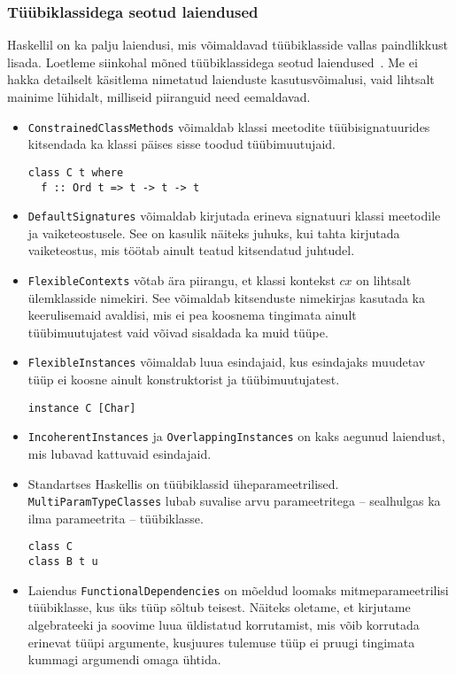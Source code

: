 \documentclass[12pt]{article}
\begin{document}
      \subsubsection{Tüübiklassidega seotud laiendused}
        Haskellil on ka palju laiendusi, mis võimaldavad tüübiklasside vallas paindlikkust lisada. Loetleme siinkohal mõned tüübiklassidega seotud laiendused~\cite{Gla}. Me ei hakka detailselt käsitlema nimetatud laienduste kasutusvõimalusi, vaid lihtsalt mainime lühidalt, milliseid piiranguid need eemaldavad.

        \begin{itemize}
          \item
            \verb!ConstrainedClassMethods! võimaldab klassi meetodite tüübisignatuurides kitsendada ka klassi päises sisse toodud tüübimuutujaid.

            \begin{verbatim}class C t where
  f :: Ord t => t -> t -> t\end{verbatim}
          \item
            \verb!DefaultSignatures! võimaldab kirjutada erineva signatuuri klassi meetodile ja vaiketeostusele. See on kasulik näiteks juhuks, kui tahta kirjutada vaiketeostus, mis töötab ainult teatud kitsendatud juhtudel.
          \item
            \verb!FlexibleContexts! võtab ära piirangu, et klassi kontekst $cx$ on lihtsalt ülemklasside nimekiri. See võimaldab kitsenduste nimekirjas kasutada ka keerulisemaid avaldisi, mis ei pea koosnema tingimata ainult tüübimuutujatest vaid võivad sisaldada ka muid tüüpe.
          \item
            \verb!FlexibleInstances! võimaldab luua esindajaid, kus esindajaks muudetav tüüp ei koosne ainult konstruktorist ja tüübimuutujatest.

            \begin{verbatim}instance C [Char]\end{verbatim}
          \item
            \verb!IncoherentInstances! ja \verb!OverlappingInstances! on kaks aegunud laiendust, mis lubavad kattuvaid esindajaid.
          \item
            Standartses Haskellis on tüübiklassid üheparameetrilised. \verb!MultiParamTypeClasses! lubab suvalise arvu parameetritega -- sealhulgas ka ilma parameetrita -- tüübiklasse.

            \begin{verbatim}
class C
class B t u\end{verbatim}
          \item
            Laiendus \verb!FunctionalDependencies! on mõeldud loomaks mitmeparameetrilisi tüübiklasse, kus üks tüüp sõltub teisest. Näiteks oletame, et kirjutame algebrateeki ja soovime luua üldistatud korrutamist, mis võib korrutada erinevat tüüpi argumente, kusjuures tulemuse tüüp ei pruugi tingimata kummagi argumendi omaga ühtida.


\end{itemize}
\end{document}
